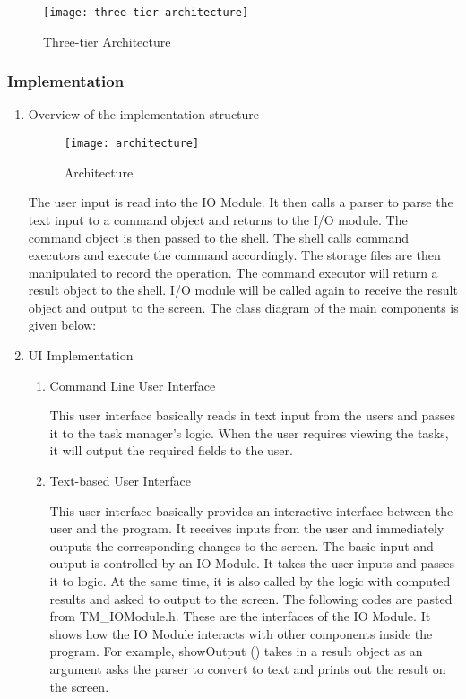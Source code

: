 \documentclass[12pt, a4paper]{article}
\begin{document}
\begin{figure}[h]
  \centering
  \texttt{[image: three-tier-architecture]}
  \caption{Three-tier Architecture}
\end{figure}

\subsubsection{Implementation}
\begin{enumerate}
\item  Overview of the implementation structure
\begin{figure}[h]
  \centering
  \texttt{[image: architecture]}
  \caption{Architecture}
\end{figure}

The user input is read into the IO Module. It then calls a parser to parse the text input to a
command object and returns to the I/O module. The command object is then passed to the
shell. The shell calls command executors and execute the command accordingly. The storage
files are then manipulated to record the operation. The command executor will return a
result object to the shell. I/O module will be called again to receive the result object and
output to the screen.
The class diagram of the main components is given below:

\item UI Implementation
\begin{enumerate}
\item Command Line User Interface

This user interface basically reads in text input from the users and passes it to the task
manager’s logic. When the user requires viewing the tasks, it will output the required
fields to the user.
\item Text-based User Interface

This user interface basically provides an interactive interface between the user and the
program. It receives inputs from the user and immediately outputs the corresponding
changes to the screen.
The basic input and output is controlled by an IO Module. It takes the user inputs and
passes it to logic. At the same time, it is also called by the logic with computed results
and asked to output to the screen. The following codes are pasted from TM\_IOModule.h.
These are the interfaces of the IO Module. It shows how the IO Module interacts with
other components inside the program. For example, showOutput () takes in a result
object as an argument asks the parser to convert to text and prints out the result on the screen.


\end{enumerate}
\end{enumerate}
\end{document}
